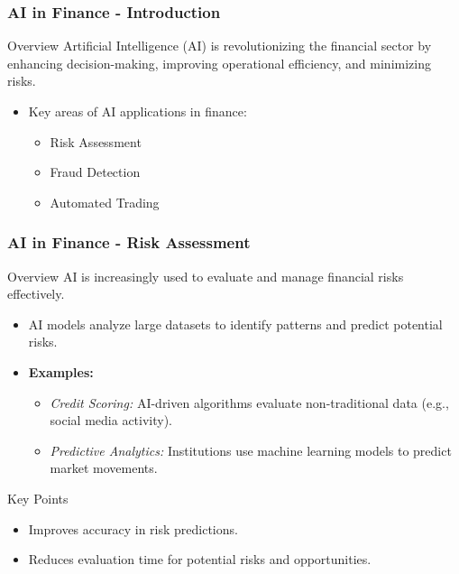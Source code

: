 \documentclass[aspectratio=169]{beamer}
\begin{document}
\begin{frame}[fragile]
    \frametitle{AI in Finance - Introduction}
    \begin{block}{Overview}
        Artificial Intelligence (AI) is revolutionizing the financial sector by enhancing decision-making, improving operational efficiency, and minimizing risks. 
    \end{block}
    \begin{itemize}
        \item Key areas of AI applications in finance:
        \begin{itemize}
            \item Risk Assessment
            \item Fraud Detection
            \item Automated Trading
        \end{itemize}
    \end{itemize}
\end{frame}

\begin{frame}[fragile]
    \frametitle{AI in Finance - Risk Assessment}
    \begin{block}{Overview}
        AI is increasingly used to evaluate and manage financial risks effectively.
    \end{block}
    \begin{itemize}
        \item AI models analyze large datasets to identify patterns and predict potential risks.
        \item \textbf{Examples:} 
        \begin{itemize}
            \item \textit{Credit Scoring:} AI-driven algorithms evaluate non-traditional data (e.g., social media activity).
            \item \textit{Predictive Analytics:} Institutions use machine learning models to predict market movements.
        \end{itemize}
    \end{itemize}
    \begin{block}{Key Points}
        \begin{itemize}
            \item Improves accuracy in risk predictions.
            \item Reduces evaluation time for potential risks and opportunities.
        \end{itemize}
    \end{block}
\end{frame}
\end{document}
